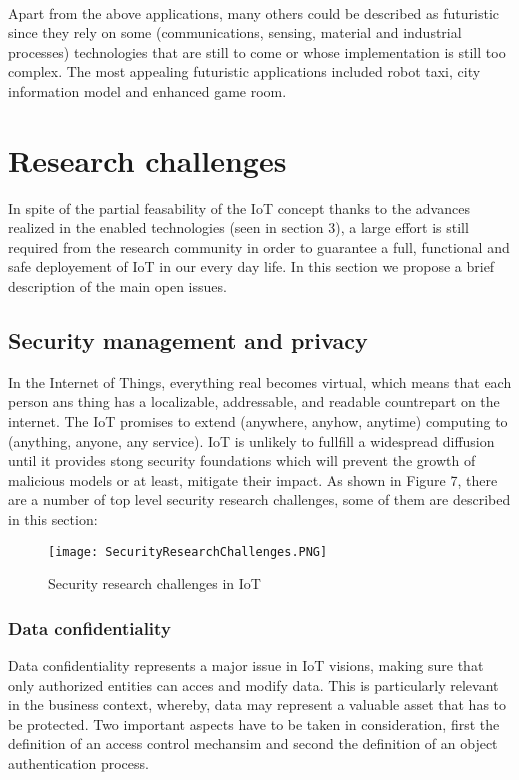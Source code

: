 \documentclass[10pt, twocolumn]{article}
\begin{document}
\paragraph{}
Apart from the above applications, many others could be described as futuristic since they rely on some (communications, sensing, material and industrial processes) technologies that are still to come or whose implementation is still too complex. The most appealing futuristic applications included robot taxi, city information model and enhanced game room.
\section{Research challenges}
In spite of the partial feasability of the IoT concept thanks to the advances realized in the enabled technologies (seen in section 3), a large effort is still required from the research community in order to guarantee a full, functional and safe deployement of IoT in our every day life. In this section we propose a brief description of the main open issues. 
\subsection{Security management and privacy}
In the Internet of Things, everything real becomes virtual, which means that each person ans thing has a localizable, addressable,  and readable countrepart on the internet. The IoT promises to extend (anywhere, anyhow, anytime) computing to (anything, anyone, any service). IoT is unlikely to fullfill a widespread diffusion until it provides stong security foundations which will prevent the growth of malicious models or at least, mitigate their impact. As shown in Figure 7, there are a number of top level security research challenges, some of them are described in this section:
\begin{figure}
\begin{center}
\texttt{[image: SecurityResearchChallenges.PNG]}
\end{center}
\caption{Security research challenges in IoT}
\end{figure}
\subsubsection{Data confidentiality} 
Data confidentiality represents a major issue in IoT visions, making sure that only authorized entities  can acces and modify data. This is particularly relevant in the business context, whereby, data may represent a valuable asset that has to be protected. Two important aspects have to be taken in consideration, first the definition of an access control mechansim and second the definition of an object authentication process.
\end{document}
